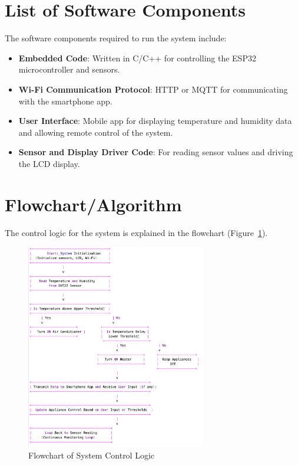 \documentclass[a4paper,12pt]{article}
\begin{document}
\section{List of Software Components}
The software components required to run the system include:
\begin{itemize}
    \item \textbf{Embedded Code}: Written in C/C++ for controlling the ESP32 microcontroller and sensors.
    \item \textbf{Wi-Fi Communication Protocol}: HTTP or MQTT for communicating with the smartphone app.
    \item \textbf{User Interface}: Mobile app for displaying temperature and humidity data and allowing remote control of the system.
    \item \textbf{Sensor and Display Driver Code}: For reading sensor values and driving the LCD display.
\end{itemize}
\newpage
\section{Flowchart/Algorithm}
The control logic for the system is explained in the flowchart (Figure~\ref{fig:flowchart}).

\begin{figure}[H]
    \centering
    \includegraphics[width=0.7\textwidth]{Fig2.png} %
    \caption{Flowchart of System Control Logic}
    \label{fig:flowchart}
\end{figure}
\end{document}
